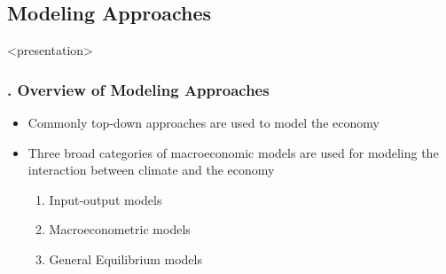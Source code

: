 \documentclass[11pt,aspectratio=169]{beamer}
\begin{document}
\subsection{Modeling Approaches}

\begin{frame}<presentation>
	\frametitle{{\thesection.\thesubsection} Overview of Modeling Approaches}
	\begin{itemize}	
	\item Commonly top-down approaches are used to model the economy
	\item Three broad categories of macroeconomic models are used for modeling the interaction between climate and the economy
	\begin{enumerate}
		\item Input-output models 
		\item Macroeconometric models
		\item General Equilibrium models
	\end{enumerate}
	\end{itemize}	
\end{frame}
\end{document}
